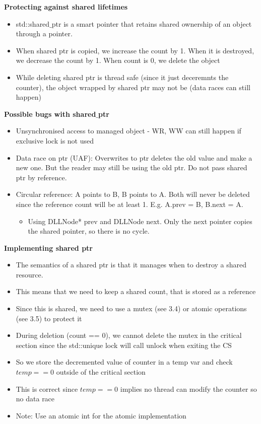 \documentclass[10pt, landscape]{article}
\begin{document}
\begin{multicols}{4}
\textbf{Protecting against shared lifetimes} \\
\begin{itemize}
    \item std::shared$\_$ptr is a smart pointer that retains shared ownership of an object through a pointer.
    \item When shared ptr is copied, we increase the count by 1. When it is destroyed, we decrease the count by 1. When count is 0, we delete the object
    \item While deleting shared ptr is thread safe (since it just deceremnts the counter), the object wrapped by shared ptr may not be (data races can still happen)
\end{itemize}

\textbf{Possible bugs with shared$\_$ptr} \\
\begin{itemize}
    \item Unsynchronised access to managed object - WR, WW can still happen if exclusive lock is not used 
    \item Data race on ptr (UAF): Overwrites to ptr deletes the old value and make a new one. But the reader may still be using the old ptr. Do not pass shared ptr by reference. 
    \item Circular reference: A points to B, B points to A. Both will never be deleted since the reference count will be at least 1. E.g. A.prev = B, B.next = A. 
    \begin{itemize}
        \item Using DLLNode* prev and DLLNode next. Only the next pointer copies the shared pointer, so there is no cycle.
    \end{itemize}
\end{itemize}

\textbf{Implementing shared ptr} \\
\begin{itemize}
    \item The semantics of a shared ptr is that it manages when to destroy a shared resource.
    \item This means that we need to keep a shared count, that is stored as a reference
    \item Since this is shared, we need to use a mutex (see 3.4) or atomic operations (see 3.5) to protect it
    \item During deletion (count == 0), we cannot delete the mutex in the critical section since the std::unique lock will call unlock when exiting the CS
    \item So we store the decremented value of counter in a temp var and check $temp==0$ outside of the critical section
    \item This is correct since $temp==0$ implies no thread can modify the counter so no data race
    \item Note: Use an atomic int for the atomic implementation
\end{itemize}


\end{multicols}
\end{document}
